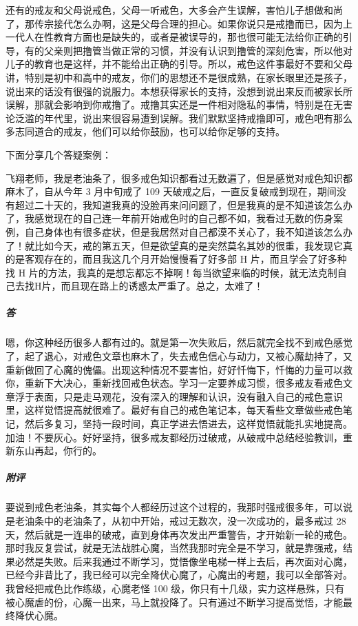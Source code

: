 还有的戒友和父母说戒色，父母一听戒色，大多会产生误解，害怕儿子想做和尚了，那传宗接代怎么办啊，这是父母合理的担心。如果你说只是戒撸而已，因为上一代人在性教育方面也是缺失的，或者是被误导的，那也很可能无法给你正确的引导，有的父亲则把撸管当做正常的习惯，并没有认识到撸管的深刻危害，所以他对儿子的教育也是这样，并不能给出正确的引导。所以，戒色这件事最好不要和父母讲，特别是初中和高中的戒友，你们的思想还不是很成熟，在家长眼里还是孩子，说出来的话没有很强的说服力。本想获得家长的支持，没想到说出来反而被家长所误解，那就会影响到你戒撸了。戒撸其实还是一件相对隐私的事情，特别是在无害论泛滥的年代里，说出来很容易遭到误解。我们默默坚持戒撸即可，戒色吧有那么多志同道合的戒友，他们可以给你鼓励，也可以给你足够的支持。

下面分享几个答疑案例：

\begin{case}
    飞翔老师，我是老油条了，很多戒色知识都看过无数遍了，但是感觉对戒色知识都麻木了，自从今年 3 月中旬戒了 109 天破戒之后，一直反复破戒到现在，期间没有超过二十天的，我知道我真的没脸再来问问题了，但是我真的是不知道该怎么办了，我感觉现在的自己连一年前开始戒色时的自己都不如，我看过无数的伤身案例，自己身体也有很多症状，但是我居然对自己都漠不关心了，我不知道该怎么办了！就比如今天，戒的第五天，但是欲望真的是突然莫名其妙的很重，我发现它真的是客观存在的，而且我这几个月开始慢慢看了好多部 H 片，而且学会了好多种找 H 片的方法，我真的是想忘都忘不掉啊！每当欲望来临的时候，就无法克制自己去找H片，而且现在路上的诱惑太严重了。总之，太难了！
    \subparagraph{答} 嗯，你这种经历很多人都有过的。就是第一次失败后，然后就完全找不到戒色感觉了，起了退心，对戒色文章也麻木了，失去戒色信心与动力，又被心魔劫持了，又重新做回了心魔的傀儡。出现这种情况不要害怕，好好忏悔下，忏悔的力量可以救你，重新下大决心，重新找回戒色状态。学习一定要养成习惯，很多戒友看戒色文章浮于表面，只是走马观花，没有深入的理解和认识，没有融入自己的戒色意识里，这样觉悟提高就很难了。最好有自己的戒色笔记本，每天看些文章做些戒色笔记，然后多复习，坚持一段时间，真正学进去悟进去，这样觉悟就能扎实地提高。加油！不要灰心。好好坚持，很多戒友都经历过破戒，从破戒中总结经验教训，重新东山再起，你行的。
    \subparagraph{附评} 要说到戒色老油条，其实每个人都经历过这个过程的，我那时强戒很多年，可以说是老油条中的老油条了，从初中开始，戒过无数次，没一次成功的，最多戒过 28 天，然后就是一连串的破戒，直到身体再次发出严重警告，才开始新一轮的戒色。那时我反复尝试，就是无法战胜心魔，当然我那时完全是不学习，就是靠强戒，结果必然是失败。后来我通过不断学习，觉悟像坐电梯一样上去后，再次面对心魔，已经今非昔比了，我已经可以完全降伏心魔了，心魔出的考题，我可以全部答对。我曾经把戒色比作练级，心魔老怪 100 级，你只有十几级，实力这样悬殊，只有被心魔虐的份，心魔一出来，马上就投降了。只有通过不断学习提高觉悟，才能最终降伏心魔。


\end{case}
